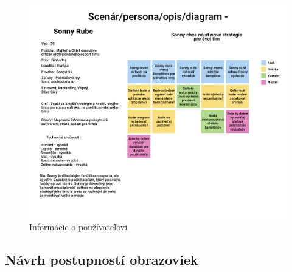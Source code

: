 \begin{figure}[h!]
	
	\includegraphics[width=.9\textwidth]{figures/scenar}
	
	\centering
	
	\caption{ Informácie o používateľovi \label{scenar}}
	
\end{figure}

\subsection{Návrh postupností obrazoviek}

